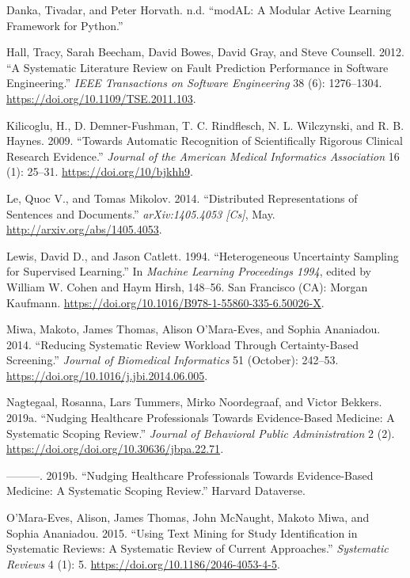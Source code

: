 \documentclass[
]{article}
\newlength{\cslhangindent}
\newenvironment{cslreferences}%
  {\setlength{\parindent}{0pt}%
  \everypar{\setlength{\hangindent}{\cslhangindent}}\ignorespaces}%
  {\par}
\begin{document}
\begin{cslreferences}
\leavevmode\hypertarget{ref-modAL2018}{}%
Danka, Tivadar, and Peter Horvath. n.d. ``modAL: A Modular Active
Learning Framework for Python.''

\leavevmode\hypertarget{ref-Hall2012}{}%
Hall, Tracy, Sarah Beecham, David Bowes, David Gray, and Steve Counsell.
2012. ``A Systematic Literature Review on Fault Prediction Performance
in Software Engineering.'' \emph{IEEE Transactions on Software
Engineering} 38 (6): 1276--1304.
\url{https://doi.org/10.1109/TSE.2011.103}.

\leavevmode\hypertarget{ref-Kilicoglu2009}{}%
Kilicoglu, H., D. Demner-Fushman, T. C. Rindflesch, N. L. Wilczynski,
and R. B. Haynes. 2009. ``Towards Automatic Recognition of
Scientifically Rigorous Clinical Research Evidence.'' \emph{Journal of
the American Medical Informatics Association} 16 (1): 25--31.
\url{https://doi.org/10/bjkhh9}.

\leavevmode\hypertarget{ref-Le2014}{}%
Le, Quoc V., and Tomas Mikolov. 2014. ``Distributed Representations of
Sentences and Documents.'' \emph{arXiv:1405.4053 {[}Cs{]}}, May.
\url{http://arxiv.org/abs/1405.4053}.

\leavevmode\hypertarget{ref-Lewis1994}{}%
Lewis, David D., and Jason Catlett. 1994. ``Heterogeneous Uncertainty
Sampling for Supervised Learning.'' In \emph{Machine Learning
Proceedings 1994}, edited by William W. Cohen and Haym Hirsh, 148--56.
San Francisco (CA): Morgan Kaufmann.
\url{https://doi.org/10.1016/B978-1-55860-335-6.50026-X}.

\leavevmode\hypertarget{ref-Miwa2014}{}%
Miwa, Makoto, James Thomas, Alison O'Mara-Eves, and Sophia Ananiadou.
2014. ``Reducing Systematic Review Workload Through Certainty-Based
Screening.'' \emph{Journal of Biomedical Informatics} 51 (October):
242--53. \url{https://doi.org/10.1016/j.jbi.2014.06.005}.

\leavevmode\hypertarget{ref-Nagtegaal2019}{}%
Nagtegaal, Rosanna, Lars Tummers, Mirko Noordegraaf, and Victor Bekkers.
2019a. ``Nudging Healthcare Professionals Towards Evidence-Based
Medicine: A Systematic Scoping Review.'' \emph{Journal of Behavioral
Public Administration} 2 (2).
\url{https://doi.org/doi.org/10.30636/jbpa.22.71}.

\leavevmode\hypertarget{ref-Nagtegaal2019a}{}%
---------. 2019b. ``Nudging Healthcare Professionals Towards
Evidence-Based Medicine: A Systematic Scoping Review.'' Harvard
Dataverse.

\leavevmode\hypertarget{ref-OMara-Eves2015}{}%
O'Mara-Eves, Alison, James Thomas, John McNaught, Makoto Miwa, and
Sophia Ananiadou. 2015. ``Using Text Mining for Study Identification in
Systematic Reviews: A Systematic Review of Current Approaches.''
\emph{Systematic Reviews} 4 (1): 5.
\url{https://doi.org/10.1186/2046-4053-4-5}.


\end{cslreferences}
\end{document}

